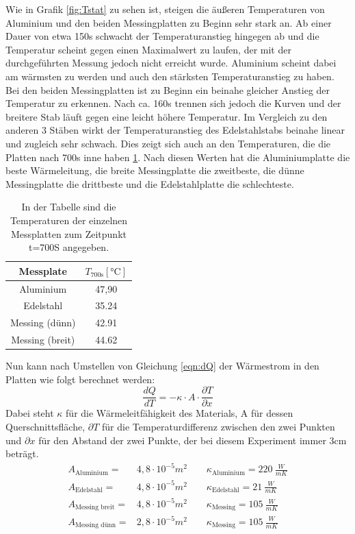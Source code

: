 \documentclass[titlepage = firstcover]{scrartcl}
\begin{document}
  Wie in Grafik \ref{fig:Tstat} zu sehen ist, steigen die äußeren Temperaturen von Aluminium und den beiden Messingplatten zu Beginn sehr stark an. Ab 
  einer Dauer von etwa 150s schwacht der Temperaturanstieg hingegen ab und die Temperatur scheint gegen einen Maximalwert zu laufen, der mit der durchgeführten
  Messung jedoch nicht erreicht wurde. Aluminium scheint dabei am wärmsten zu werden und auch den stärksten Temperaturanstieg zu haben. Bei den beiden
  Messingplatten ist zu Beginn ein beinahe gleicher Anstieg der Temperatur zu erkennen. Nach ca. 160s trennen sich jedoch die Kurven und der breitere Stab läuft
  gegen eine leicht höhere Temperatur. Im Vergleich zu den anderen 3 Stäben wirkt der Temperaturanstieg des Edelstahlstabs beinahe linear und zugleich sehr schwach.
  Dies zeigt sich auch an den Temperaturen, die die Platten nach 700s inne haben \ref{tab:700s}. Nach diesen Werten hat die Aluminiumplatte die beste Wärmeleitung,
  die breite Messingplatte die zweitbeste, die dünne Messingplatte die drittbeste und die Edelstahlplatte die schlechteste.

  \begin{table}[h]
    \centering
    \caption{In der Tabelle sind die Temperaturen der einzelnen Messplatten zum Zeitpunkt t=700S angegeben.}
    \label{tab:700s}
    \begin{tabular}{c c}
      \toprule
      {Messplate} & {$T_{\text{700s}} [\text{°C}]$} \\
      \midrule 
      Aluminium & 47,90 \\
      Edelstahl & 35.24 \\
      Messing (dünn) & 42.91 \\
      Messing (breit) & 44.62 \\
      \bottomrule
    \end{tabular}
  \end{table}


  Nun kann nach Umstellen von Gleichung \eqref{eqn:dQ} der Wärmestrom in den Platten wie folgt berechnet werden:
  \begin{equation*}
    \frac{dQ}{dT} = - \kappa \cdot A \cdot \frac{\partial T}{\partial x}
  \end{equation*}
  Dabei steht $\kappa$ für die Wärmeleitfähigkeit des Materials, A für dessen Querschnittsfläche, $\partial T$ für die Temperaturdifferenz zwischen den zwei 
  Punkten und $\partial x$ für den Abstand der zwei Punkte, der bei diesem Experiment immer 3cm beträgt.
  \begin{align*}
    A_{\text{Aluminium}} =& 4,8 \cdot 10^{-5} m^2 \qquad    \kappa_{\text{Aluminium}}=220 \: \frac{W}{mK}\\
    A_{\text{Edelstahl}} =& 4,8 \cdot 10^{-5} m^2 \qquad    \kappa_{\text{Edelstahl}}=21 \: \frac{W}{mK}\\
    A_{\text{Messing breit}} =& 4,8 \cdot 10^{-5} m^2 \qquad \kappa_{\text{Messing}}=105  \: \frac{W}{mK}  \\
    A_{\text{Messing dünn}} =& 2,8 \cdot 10^{-5} m^2 \qquad \kappa_{\text{Messing}}=105  \: \frac{W}{mK}  \\
  \end{align*}
\end{document}
